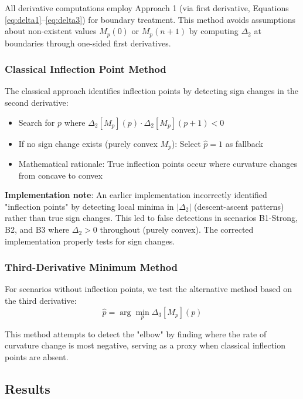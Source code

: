 \documentclass[11pt,a4paper]{article}
\begin{document}
All derivative computations employ Approach 1 (via first derivative, Equations \ref{eq:delta1}--\ref{eq:delta3}) for boundary treatment. This method avoids assumptions about non-existent values $M_p(0)$ or $M_p(n+1)$ by computing $\Delta_2$ at boundaries through one-sided first derivatives.

\subsubsection{Classical Inflection Point Method}

The classical approach identifies inflection points by detecting sign changes in the second derivative:
\begin{itemize}
\item Search for $p$ where $\Delta_2[M_p](p) \cdot \Delta_2[M_p](p+1) < 0$
\item If no sign change exists (purely convex $M_p$): Select $\hat{p} = 1$ as fallback
\item Mathematical rationale: True inflection points occur where curvature changes from concave to convex
\end{itemize}

\textbf{Implementation note}: An earlier implementation incorrectly identified "inflection points" by detecting local minima in $|\Delta_2|$ (descent-ascent patterns) rather than true sign changes. This led to false detections in scenarios B1-Strong, B2, and B3 where $\Delta_2 > 0$ throughout (purely convex). The corrected implementation properly tests for sign changes.

\subsubsection{Third-Derivative Minimum Method}

For scenarios without inflection points, we test the alternative method based on the third derivative:
\begin{equation}
\hat{p} = \arg\min_p \Delta_3[M_p](p)
\end{equation}

This method attempts to detect the "elbow" by finding where the rate of curvature change is most negative, serving as a proxy when classical inflection points are absent.

\subsection{Results}
\end{document}
